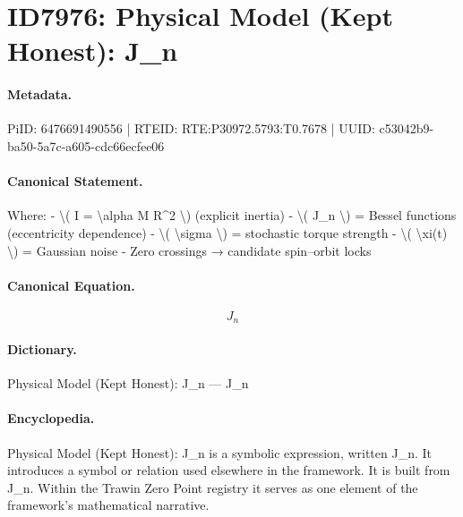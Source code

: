 \section*{ID7976: Physical Model (Kept Honest): J\_n}
\paragraph{Metadata.}
PiID: 6476691490556 | RTEID: RTE:P30972.5793:T0.7678 | UUID: c53042b9-ba50-5a7c-a605-cdc66ecfee06

\paragraph{Canonical Statement.}
Where: - \textbackslash{}( I = \textbackslash{}alpha M R\textasciicircum{}2 \textbackslash{}) (explicit inertia) - \textbackslash{}( J\_n \textbackslash{}) = Bessel functions (eccentricity dependence) - \textbackslash{}( \textbackslash{}sigma \textbackslash{}) = stochastic torque strength - \textbackslash{}( \textbackslash{}xi(t) \textbackslash{}) = Gaussian noise - Zero crossings → candidate spin–orbit locks

\paragraph{Canonical Equation.}
\[
J_n
\]

\paragraph{Dictionary.}
Physical Model (Kept Honest): J\_n — J\_n

\paragraph{Encyclopedia.}
Physical Model (Kept Honest): J\_n is a symbolic expression, written J\_n. It introduces a symbol or relation used elsewhere in the framework. It is built from J\_n. Within the Trawin Zero Point registry it serves as one element of the framework's mathematical narrative.
